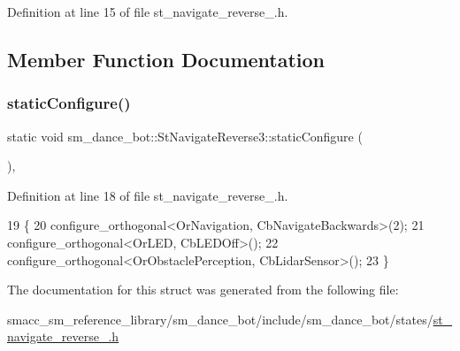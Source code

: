 Definition at line 15 of file st\+\_\+navigate\+\_\+reverse\+\_.\+h.



\subsection{Member Function Documentation}
\mbox{\label{structsm__dance__bot_1_1StNavigateReverse3_a01fcc1e52c2bc616febfc19c01c72612}} 
\subsubsection{\texorpdfstring{static\+Configure()}{staticConfigure()}}
{\footnotesize\ttfamily static void sm\+\_\+dance\+\_\+bot\+::\+St\+Navigate\+Reverse3\+::static\+Configure (\begin{DoxyParamCaption}{ }\end{DoxyParamCaption})\hspace{0.3cm}{\ttfamily [inline]}, {\ttfamily [static]}}



Definition at line 18 of file st\+\_\+navigate\+\_\+reverse\+\_.\+h.


\begin{DoxyCode}
19    \{
20       configure\_orthogonal<OrNavigation, CbNavigateBackwards>(2);
21       configure\_orthogonal<OrLED, CbLEDOff>();
22       configure\_orthogonal<OrObstaclePerception, CbLidarSensor>();
23    \}
\end{DoxyCode}


The documentation for this struct was generated from the following file\+:\begin{DoxyCompactItemize}
\item 
smacc\+\_\+sm\+\_\+reference\+\_\+library/sm\+\_\+dance\+\_\+bot/include/sm\+\_\+dance\+\_\+bot/states/\hyperlink{include_2sm__dance__bot_2states_2st__navigate__reverse__3_8h}{st\+\_\+navigate\+\_\+reverse\+\_.\+h}\end{DoxyCompactItemize}
